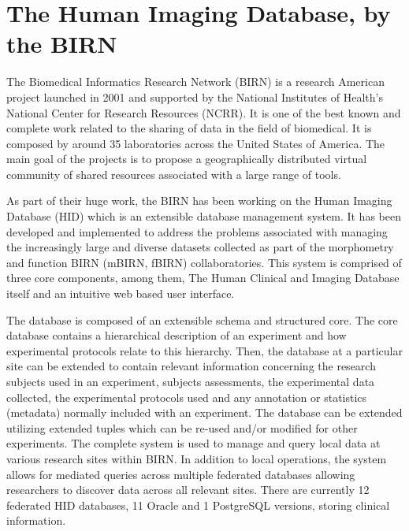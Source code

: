 \section{The Human Imaging Database, by the BIRN}
\par
The Biomedical Informatics Research Network (BIRN) is a research American project launched in 2001 and supported by the National Institutes of Health's National Center for Research Resources (NCRR). It is one of the best known and complete work related to the sharing of data in the field of biomedical. It is composed by around 35 laboratories across the United States of America. The main goal of the projects is to propose a geographically distributed virtual community of shared resources associated with a large range of tools.
\par
As part of their huge work, the BIRN has been working on the Human Imaging Database (HID) which is an extensible database management system. It has been developed and implemented to address the problems associated with managing the increasingly large and diverse datasets collected as part of the morphometry and function BIRN (mBIRN, fBIRN) collaboratories. This system is comprised of three core components, among them, The Human Clinical and Imaging Database itself and an intuitive web based user interface.
\par
The database is composed of an extensible schema and structured core. The core database contains a hierarchical description of an experiment and how experimental protocols relate to this hierarchy. Then, the database at a particular site can be extended to contain relevant information concerning the research subjects used in an experiment, subjects assessments, the experimental data collected, the experimental protocols used and any annotation or statistics (metadata) normally included with an experiment. The database can be extended utilizing extended tuples which can be re-used and/or modified for other experiments. The complete system is used to manage and query local data at various research sites within BIRN. In addition to local operations, the system allows for mediated queries across multiple federated databases allowing researchers to discover data across all relevant sites. There are currently 12 federated HID databases, 11 Oracle and 1 PostgreSQL versions, storing clinical information.
\par
